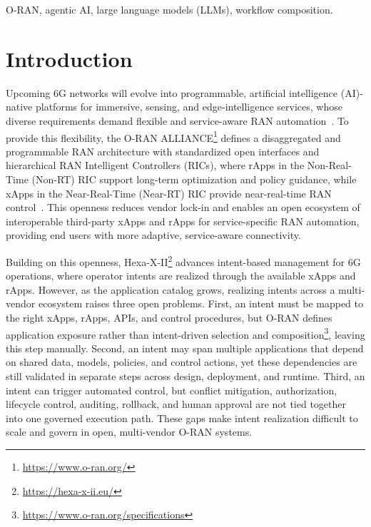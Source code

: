 \documentclass[conference]{IEEEtran}
\begin{document}
\begin{IEEEkeywords}
O-RAN, agentic AI, large language models (LLMs), workflow composition.
\end{IEEEkeywords}

\IEEEpeerreviewmaketitle

\section{Introduction}\label{sec:sec1} 
Upcoming 6G networks will evolve into programmable, artificial intelligence (AI)-native platforms for immersive, sensing, and edge-intelligence services, whose diverse requirements demand flexible and service-aware RAN automation~\cite{polese2026beyond}. To provide this flexibility, the O-RAN ALLIANCE\footnote{\url{https://www.o-ran.org/}} defines a disaggregated and programmable RAN architecture with standardized open interfaces and hierarchical RAN Intelligent Controllers (RICs), where rApps in the Non-Real-Time (Non-RT) RIC support long-term optimization and policy guidance, while xApps in the Near-Real-Time (Near-RT) RIC provide near-real-time RAN control~\cite{almeida2023ric}.
This openness reduces vendor lock-in and enables an open ecosystem of interoperable third-party xApps and rApps for service-specific RAN automation, providing end users with more adaptive, service-aware connectivity.


Building on this openness, Hexa-X-II\footnote{\url{https://hexa-x-ii.eu/}} advances intent-based management for 6G operations, where operator intents are realized through the available xApps and rApps. However, as the application catalog grows, realizing intents across a multi-vendor ecosystem raises three open problems. First, an intent must be mapped to the right xApps, rApps, APIs, and control procedures, but O-RAN defines application exposure rather than intent-driven selection and composition\footnote{\url{https://www.o-ran.org/specifications}}, leaving this step manually. Second, an intent may span multiple applications that depend on shared data, models, policies, and control actions, yet these dependencies are still validated in separate steps across design, deployment, and runtime. Third, an intent can trigger automated control, but conflict mitigation, authorization, lifecycle control, auditing, rollback, and human approval are not tied together into one governed execution path. These gaps make intent realization difficult to scale and govern in open, multi-vendor O-RAN systems.
\end{document}
